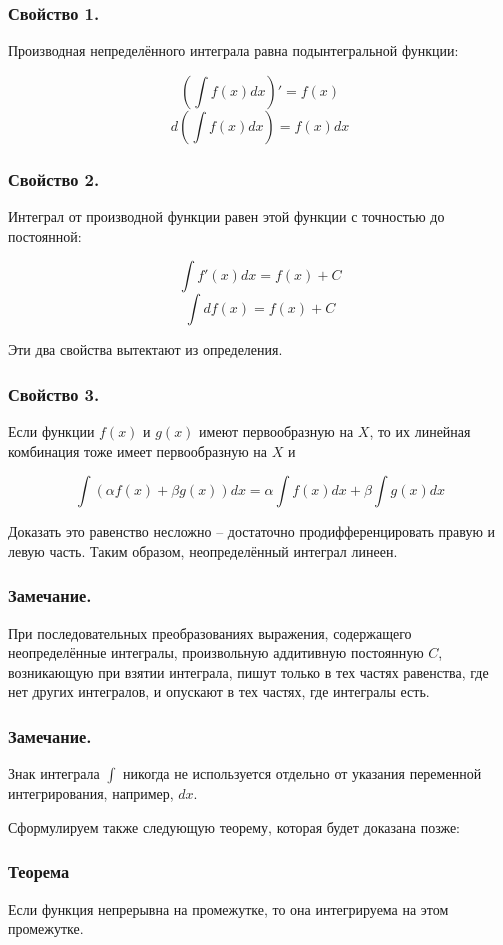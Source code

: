 \subsubsection{Свойство 1.}
Производная непределённого интеграла равна подынтегральной функции:

$$\left(\int f(x) dx \right)'=f(x)$$
$$d\left(\int f(x) dx \right)=f(x)dx$$

\subsubsection{Свойство 2.}
Интеграл от производной функции равен этой функции с точностью до постоянной:

$$\int f'(x)dx=f(x)+C$$
$$\int df(x)=f(x)+C$$

Эти два свойства вытектают из определения.

\subsubsection{Свойство 3.}
Если функции $f(x)$ и  $g(x)$ имеют первообразную на $X$, то их линейная комбинация тоже имеет первообразную на $X$ и 

$$\int(\alpha f(x) + \beta g(x))dx=\alpha \int f(x)dx+ \beta \int g(x)dx$$

Доказать это равенство несложно -- достаточно продифференцировать правую и левую часть.
Таким образом, неопределённый интеграл линеен.

\subsubsection{Замечание.}

При последовательных преобразованиях выражения, содержащего неопределённые интегралы, произвольную аддитивную постоянную $C$, возникающую при взятии интеграла, пишут только в тех частях равенства, где нет других интегралов, и опускают в тех частях, где интегралы есть.

\subsubsection{Замечание.}

Знак интеграла $\int$ никогда не используется отдельно от указания переменной интегрирования, например, $dx$.

Сформулируем также следующую теорему, которая будет доказана позже:

\subsubsection{Теорема}

Если функция непрерывна на промежутке, то она интегрируема на этом промежутке.
